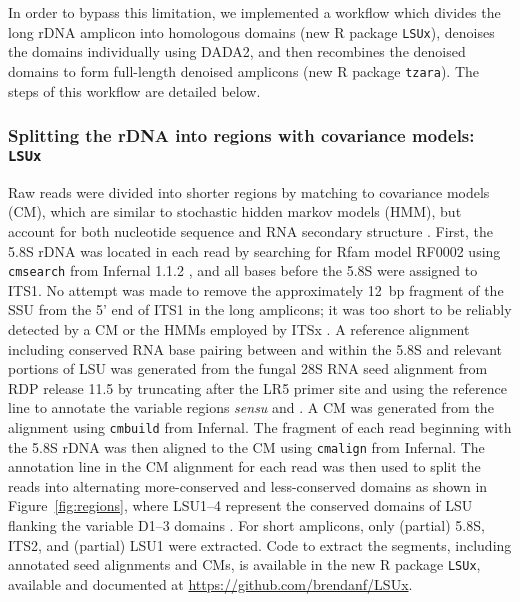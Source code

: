 \documentclass[
]{article}
\begin{document}
In order to bypass this limitation, we implemented a workflow which divides the long rDNA amplicon into homologous domains (new R package \texttt{LSUx}), denoises the domains individually using DADA2, and then recombines the denoised domains to form full-length denoised amplicons (new R package \texttt{tzara}).
The steps of this workflow are detailed below.

\hypertarget{splitting-the-rdna-into-regions-with-covariance-models-lsux}{%
\subsubsection{\texorpdfstring{Splitting the rDNA into regions with covariance models: \texttt{LSUx}}{Splitting the rDNA into regions with covariance models: LSUx}}\label{splitting-the-rdna-into-regions-with-covariance-models-lsux}}

Raw reads were divided into shorter regions by matching to covariance models (CM), which are similar to stochastic hidden markov models (HMM), but account for both nucleotide sequence and RNA secondary structure \autocite{eddy1994}.
First, the 5.8S rDNA was located in each read by searching for Rfam model RF0002 \autocite{kalvari2018} using \texttt{cmsearch} from Infernal 1.1.2 \autocite{nawrocki2013}, and all bases before the 5.8S were assigned to ITS1.
No attempt was made to remove the approximately 12~bp fragment of the SSU from the 5' end of ITS1 in the long amplicons; it was too short to be reliably detected by a CM or the HMMs employed by ITSx \autocite{bengtsson-palme2013}.
A reference alignment including conserved RNA base pairing between and within the 5.8S and relevant portions of LSU was generated from the fungal 28S RNA seed alignment from RDP release 11.5 \autocite{glockner2017,cole2014} by truncating after the LR5 primer site and using the reference line to annotate the variable regions \emph{sensu} \textcite{michot1984} and \textcite{raue1988}.
A CM was generated from the alignment using \texttt{cmbuild} from Infernal.
The fragment of each read beginning with the 5.8S rDNA was then aligned to the CM using \texttt{cmalign} from Infernal.
The annotation line in the CM alignment for each read was then used to split the reads into alternating more-conserved and less-conserved domains as shown in Figure~\ref{fig:regions},
where LSU1--4 represent the conserved domains of LSU flanking the variable D1--3 domains \autocite{michot1984}.
For short amplicons, only (partial) 5.8S, ITS2, and (partial) LSU1 were extracted.
Code to extract the segments, including annotated seed alignments and CMs, is available in the new R package \texttt{LSUx}, available and documented at \url{https://github.com/brendanf/LSUx}.
\end{document}

